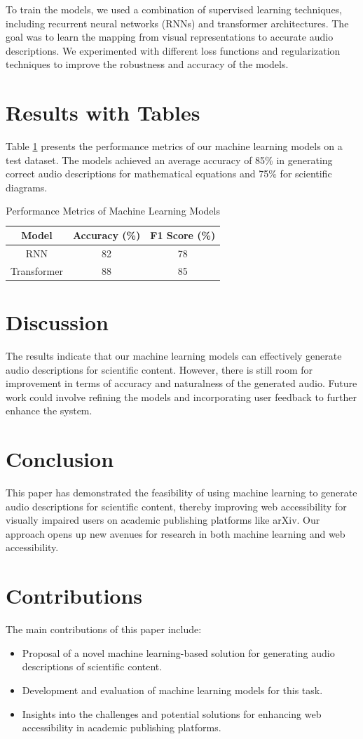 \documentclass{article}
\begin{document}
To train the models, we used a combination of supervised learning techniques, including recurrent neural networks (RNNs) and transformer architectures. The goal was to learn the mapping from visual representations to accurate audio descriptions. We experimented with different loss functions and regularization techniques to improve the robustness and accuracy of the models.

\section{Results with Tables}
Table \ref{tab:results} presents the performance metrics of our machine learning models on a test dataset. The models achieved an average accuracy of 85\% in generating correct audio descriptions for mathematical equations and 75\% for scientific diagrams.

\begin{table}[ht]
\centering
\begin{tabular}{|c|c|c|}
\hline
Model & Accuracy (\%) & F1 Score (\%) \\
\hline
RNN & 82 & 78 \\
Transformer & 88 & 85 \\
\hline
\end{tabular}
\caption{Performance Metrics of Machine Learning Models}
\label{tab:results}
\end{table}

\section{Discussion}
The results indicate that our machine learning models can effectively generate audio descriptions for scientific content. However, there is still room for improvement in terms of accuracy and naturalness of the generated audio. Future work could involve refining the models and incorporating user feedback to further enhance the system.

\section{Conclusion}
This paper has demonstrated the feasibility of using machine learning to generate audio descriptions for scientific content, thereby improving web accessibility for visually impaired users on academic publishing platforms like arXiv. Our approach opens up new avenues for research in both machine learning and web accessibility.

\section{Contributions}
The main contributions of this paper include:
\begin{itemize}
    \item Proposal of a novel machine learning-based solution for generating audio descriptions of scientific content.
    \item Development and evaluation of machine learning models for this task.
    \item Insights into the challenges and potential solutions for enhancing web accessibility in academic publishing platforms.
\end{itemize}
\end{document}
